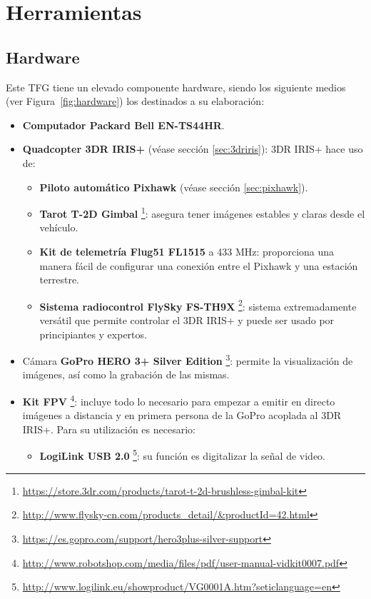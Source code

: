 \section{Herramientas}
\label{sec:herramientastfg}

\subsection{Hardware}
\label{sec:hardware}

Este \acs{TFG} tiene un elevado componente hardware, siendo los siguiente medios (ver Figura~\ref{fig:hardware}) los destinados a su elaboración:

\begin{itemize}
\item \textbf{Computador Packard Bell EN-TS44HR}.
\item \textbf{Quadcopter 3DR IRIS+} (véase sección \ref{sec:3driris}): 3DR IRIS+ hace uso de:
	\begin{itemize}
	\item \textbf{Piloto automático Pixhawk} (véase sección \ref{sec:pixhawk}).
	\item \textbf{Tarot T-2D Gimbal} \footnote{\url{https://store.3dr.com/products/tarot-t-2d-brushless-gimbal-kit}}: asegura tener imágenes estables y claras desde el vehículo.
	\item \textbf{Kit de telemetría Flug51 FL1515} a 433 MHz: proporciona una manera fácil de configurar una conexión entre el Pixhawk y una estación terrestre.
	\item \textbf{Sistema radiocontrol FlySky FS-TH9X} \footnote{\url{http://www.flysky-cn.com/products_detail/&productId=42.html}}: sistema extremadamente versátil que permite controlar el 3DR IRIS+ y puede ser usado por principiantes y expertos.
	\end{itemize}
\item Cámara \textbf{GoPro HERO 3+ Silver Edition} \footnote{\url{https://es.gopro.com/support/hero3plus-silver-support}}: permite la visualización de imágenes, así como la grabación de las mismas.
\item \textbf{Kit \acs{FPV}} \footnote{\url{http://www.robotshop.com/media/files/pdf/user-manual-vidkit0007.pdf}}: incluye todo lo necesario para empezar a emitir en directo imágenes a distancia y en primera persona de la GoPro acoplada al 3DR IRIS+. Para su utilización es necesario:
	\begin{itemize}
	\item \textbf{LogiLink USB 2.0} \footnote{\url{http://www.logilink.eu/showproduct/VG0001A.htm?seticlanguage=en}}: su función es digitalizar la señal de video. \\
	\end{itemize}
\end{itemize}

